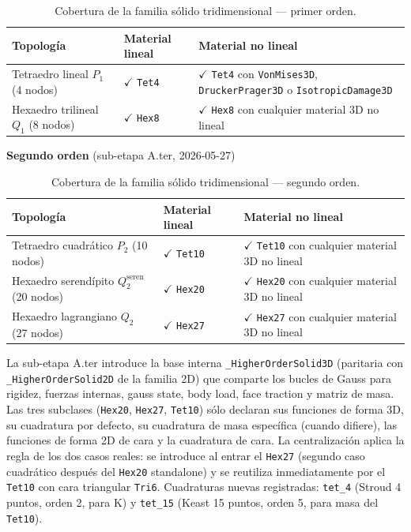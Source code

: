 \documentclass[11pt,oneside]{report}
\begin{document}
\begin{table}[h]
\centering
\caption{Cobertura de la familia sólido tridimensional --- primer orden.}
\begin{tabularx}{\textwidth}{YYY}
\hline
\textbf{Topología} & \textbf{Material lineal} & \textbf{Material no lineal} \\
\hline
Tetraedro lineal $P_1$ (4 nodos) & \ensuremath{\checkmark} \texttt{Tet4} & \ensuremath{\checkmark} \texttt{Tet4} con \texttt{VonMises3D}, \texttt{DruckerPrager3D} o \texttt{IsotropicDamage3D} \\
Hexaedro trilineal $Q_1$ (8 nodos) & \ensuremath{\checkmark} \texttt{Hex8} & \ensuremath{\checkmark} \texttt{Hex8} con cualquier material 3D no lineal \\
\hline
\end{tabularx}
\end{table}
\textbf{Segundo orden} (sub-etapa A.ter, 2026-05-27)

\begin{table}[h]
\centering
\caption{Cobertura de la familia sólido tridimensional --- segundo orden.}
\begin{tabularx}{\textwidth}{YYY}
\hline
\textbf{Topología} & \textbf{Material lineal} & \textbf{Material no lineal} \\
\hline
Tetraedro cuadrático $P_2$ (10 nodos) & \ensuremath{\checkmark} \texttt{Tet10} & \ensuremath{\checkmark} \texttt{Tet10} con cualquier material 3D no lineal \\
Hexaedro serendípito $Q_2^{\text{seren}}$ (20 nodos) & \ensuremath{\checkmark} \texttt{Hex20} & \ensuremath{\checkmark} \texttt{Hex20} con cualquier material 3D no lineal \\
Hexaedro lagrangiano $Q_2$ (27 nodos) & \ensuremath{\checkmark} \texttt{Hex27} & \ensuremath{\checkmark} \texttt{Hex27} con cualquier material 3D no lineal \\
\hline
\end{tabularx}
\end{table}
La sub-etapa A.ter introduce la base interna \texttt{\_\allowbreak{}HigherOrderSolid3D} (paritaria con \texttt{\_\allowbreak{}HigherOrderSolid2D} de la familia 2D) que comparte los bucles de Gauss para rigidez, fuerzas internas, gauss state, body load, face traction y matriz de masa. Las tres subclases (\texttt{Hex20}, \texttt{Hex27}, \texttt{Tet10}) sólo declaran sus funciones de forma 3D, su cuadratura por defecto, su cuadratura de masa específica (cuando difiere), las funciones de forma 2D de cara y la cuadratura de cara. La centralización aplica la regla de los dos casos reales: se introduce al entrar el \texttt{Hex27} (segundo caso cuadrático después del \texttt{Hex20} standalone) y se reutiliza inmediatamente por el \texttt{Tet10} con cara triangular \texttt{Tri6}. Cuadraturas nuevas registradas: \texttt{tet\_4} (Stroud 4 puntos, orden 2, para K) y \texttt{tet\_15} (Keast 15 puntos, orden 5, para masa del \texttt{Tet10}).
\end{document}
